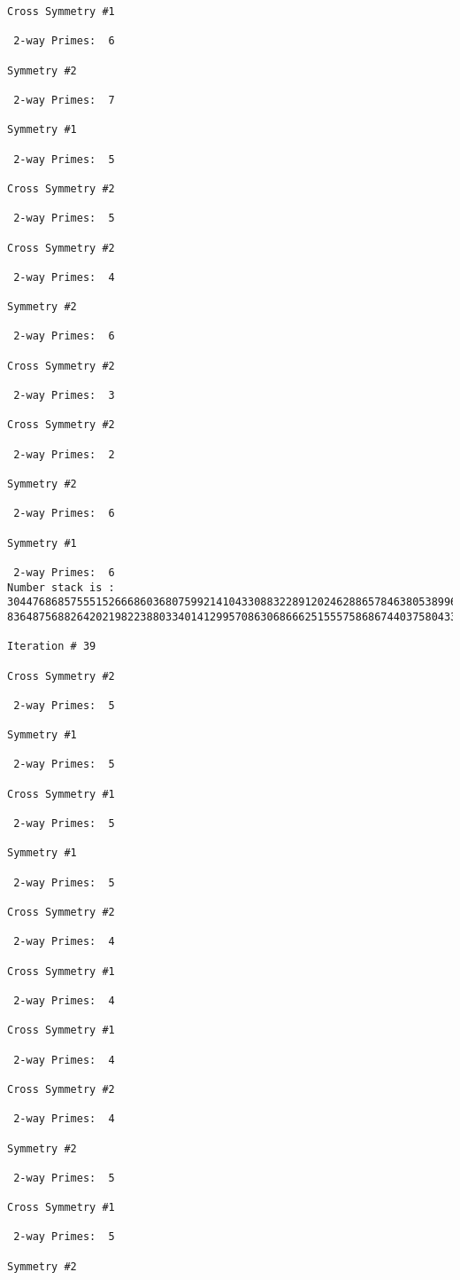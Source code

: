{{{{\begin{verbatim}
Cross Symmetry #1

 2-way Primes: 	6

Symmetry #2

 2-way Primes: 	7

Symmetry #1

 2-way Primes: 	5

Cross Symmetry #2

 2-way Primes: 	5

Cross Symmetry #2

 2-way Primes: 	4

Symmetry #2

 2-way Primes: 	6

Cross Symmetry #2

 2-way Primes: 	3

Cross Symmetry #2

 2-way Primes: 	2

Symmetry #2

 2-way Primes: 	6

Symmetry #1

 2-way Primes: 	6
Number stack is :
30447686857555152666860368075992141043308832289120246288657846380538996794608835958544046240163340857
83648756882642021982238803340141299570863068666251555758686744037580433610426404458595388064976998350

Iteration #	39

Cross Symmetry #2

 2-way Primes: 	5

Symmetry #1

 2-way Primes: 	5

Cross Symmetry #1

 2-way Primes: 	5

Symmetry #1

 2-way Primes: 	5

Cross Symmetry #2

 2-way Primes: 	4

Cross Symmetry #1

 2-way Primes: 	4

Cross Symmetry #1

 2-way Primes: 	4

Cross Symmetry #2

 2-way Primes: 	4

Symmetry #2

 2-way Primes: 	5

Cross Symmetry #1

 2-way Primes: 	5

Symmetry #2


\end{verbatim}}}}}
